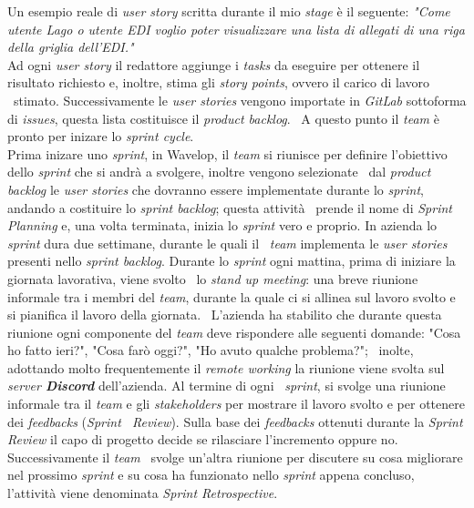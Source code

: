Un esempio reale di \emph{user story} scritta durante il mio \emph{stage} è il seguente: 
\newline
\emph{"Come utente Lago o utente EDI voglio poter visualizzare una lista di allegati di una riga della griglia dell'EDI."} \\

Ad ogni \emph{user story} il redattore aggiunge i \emph{tasks} da eseguire per ottenere il risultato richiesto e, inoltre, stima gli \emph{story points}, ovvero il carico di lavoro \
stimato. Successivamente le \emph{user stories} vengono importate in \emph{GitLab} sottoforma di \emph{issues}, questa lista costituisce il \emph{product backlog}. \
A questo punto il \emph{team} è pronto per inizare lo \emph{sprint cycle}. \\

Prima inizare uno \emph{sprint}, in Wavelop, il \emph{team} si riunisce per definire l'obiettivo dello \emph{sprint} che si andrà a svolgere, inoltre vengono selezionate \
dal \emph{product backlog} le \emph{user stories} che dovranno essere implementate durante lo \emph{sprint}, andando a costituire lo \emph{sprint backlog}; questa attività \
prende il nome di \emph{Sprint Planning} e, una volta terminata, inizia lo \emph{sprint} vero e proprio. In azienda lo \emph{sprint} dura due settimane, durante le quali il \
\emph{team} implementa le \emph{user stories} presenti nello \emph{sprint backlog}. Durante lo \emph{sprint} ogni mattina, prima di iniziare la giornata lavorativa, viene svolto \
lo \emph{stand up meeting}: una breve riunione informale tra i membri del \emph{team}, durante la quale ci si allinea sul lavoro svolto e si pianifica il lavoro della giornata. \
L'azienda ha stabilito che durante questa riunione ogni componente del \emph{team} deve rispondere alle seguenti domande: "Cosa ho fatto ieri?", "Cosa farò oggi?", "Ho avuto qualche problema?"; \
inolte, adottando molto frequentemente il \emph{remote working} la riunione viene svolta sul \emph{server \textbf{Discord}} dell'azienda. Al termine di ogni \
\emph{sprint}, si svolge una riunione informale tra il \emph{team} e gli \emph{\glspl{stakeholder}} per mostrare il lavoro svolto e per ottenere dei \emph{feedbacks} (\emph{Sprint \
Review}). Sulla base dei \emph{feedbacks} ottenuti durante la \emph{Sprint Review} il capo di progetto decide se rilasciare l'incremento oppure no. Successivamente il \emph{team} \
svolge un'altra riunione per discutere su cosa migliorare nel prossimo \emph{sprint} e su cosa ha funzionato nello \emph{sprint} appena concluso, l'attività viene denominata \emph{Sprint Retrospective}. 

